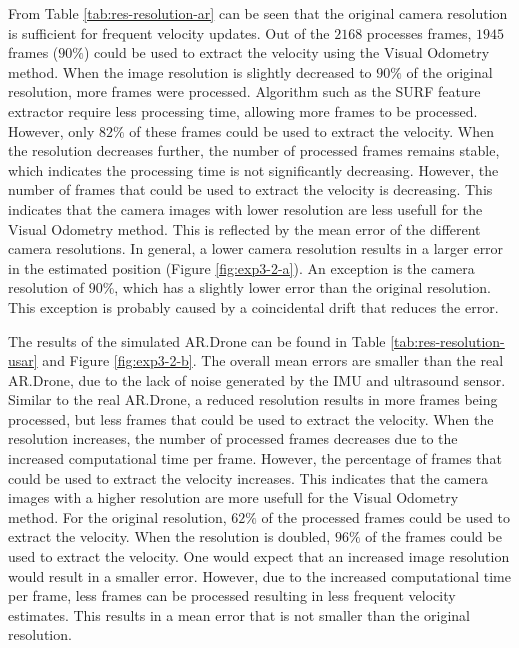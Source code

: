 From Table \ref{tab:res-resolution-ar} can be seen that the original camera resolution is sufficient for frequent velocity updates.
Out of the $2168$ processes frames, $1945$ frames ($90\%$) could be used to extract the velocity using the Visual Odometry method.
When the image resolution is slightly decreased to $90\%$ of the original resolution, more frames were processed.
Algorithm such as the SURF feature extractor require less processing time, allowing more frames to be processed.
However, only $82\%$ of these frames could be used to extract the velocity.
When the resolution decreases further, the number of processed frames remains stable, which indicates the processing time is not significantly decreasing.
However, the number of frames that could be used to extract the velocity is decreasing.
This indicates that the camera images with lower resolution are less usefull for the Visual Odometry method.
This is reflected by the mean error of the different camera resolutions.
In general, a lower camera resolution results in a larger error in the estimated position (Figure \ref{fig:exp3-2-a}).
An exception is the camera resolution of $90\%$, which has a slightly lower error than the original resolution.
This exception is probably caused by a coincidental drift that reduces the error.

The results of the simulated AR.Drone can be found in Table \ref{tab:res-resolution-usar} and Figure \ref{fig:exp3-2-b}.
The overall mean errors are smaller than the real AR.Drone, due to the lack of noise generated by the IMU and ultrasound sensor.
Similar to the real AR.Drone, a reduced resolution results in more frames being processed, but less frames that could be used to extract the velocity.
When the resolution increases, the number of processed frames decreases due to the increased computational time per frame.
However, the percentage of frames that could be used to extract the velocity increases.
This indicates that the camera images with a higher resolution are more usefull for the Visual Odometry method.
For the original resolution, $62\%$ of the processed frames could be used to extract the velocity. When the resolution is doubled, $96\%$ of the frames could be used to extract the velocity.
One would expect that an increased image resolution would result in a smaller error.
However, due to the increased computational time per frame, less frames can be processed resulting in less frequent velocity estimates.
This results in a mean error that is not smaller than the original resolution.

